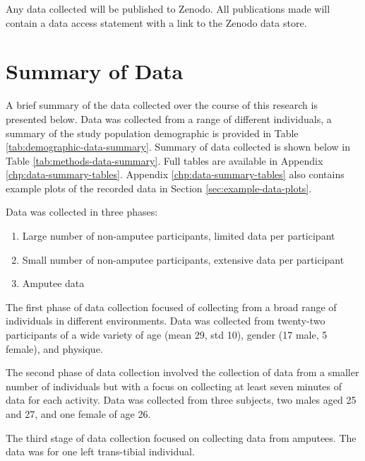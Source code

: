 Any data collected will be published to Zenodo. All publications made will contain a data access statement with a link to the Zenodo data store.

\section{Summary of Data}
A brief summary of the data collected over the course of this research is presented below. Data was collected from a range of different individuals, a summary of the study population demographic is provided in Table \ref{tab:demographic-data-summary}. Summary of data collected is shown below in Table \ref{tab:methods-data-summary}. Full tables are available in Appendix \ref{chp:data-summary-tables}. Appendix \ref{chp:data-summary-tables} also contains example plots of the recorded data in Section \ref{sec:example-data-plots}.

Data was collected in three phases:
\begin{enumerate}
    \item Large number of non-amputee participants, limited data per participant
    \item Small number of non-amputee participants, extensive data per participant
    \item Amputee data
\end{enumerate}

The first phase of data collection focused of collecting from a broad range of individuals in different environments. Data was collected from twenty-two participants of a wide variety of age (mean 29, std 10), gender (17 male, 5 female), and physique.

The second phase of data collection involved the collection of data from a smaller number of individuals but with a focus on collecting at least seven minutes of data for each activity. Data was collected from three subjects, two males aged 25 and 27, and one female of age 26.

The third stage of data collection focused on collecting data from amputees. The data was for one left trans-tibial individual.


